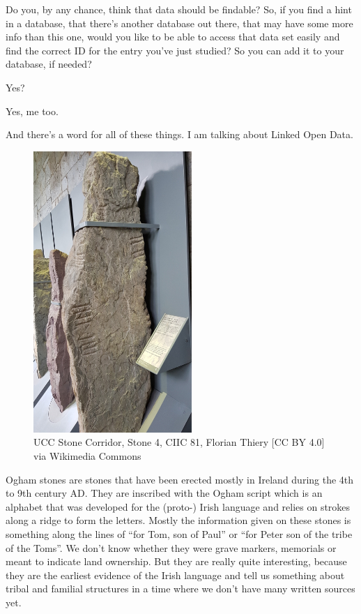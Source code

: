 \documentclass[twocolumn]{autart}
\begin{document}
Do you, by any chance, think that data should be findable? So, if you find a hint in a database, that there’s another database out there, that may have some more info than this one, would you like to be able to access that data set easily and find the correct ID for the entry you’ve just studied? So you can add it to your database, if needed?

Yes?

Yes, me too.

And there’s a word for all of these things. I am talking about Linked Open Data.

\begin{figure}[!htb]
\begin{center}
\includegraphics[width=6cm]{UCC_Stone_4.jpg}
\caption{UCC Stone Corridor, Stone 4, CIIC 81, Florian Thiery [CC BY 4.0] via Wikimedia Commons}
\label{rq1}
\end{center}
\end{figure}

Ogham stones are stones that have been erected mostly in Ireland during the 4th to 9th century AD. They are inscribed with the Ogham script which is an alphabet that was developed for the (proto-) Irish language and relies on strokes along a ridge to form the letters. Mostly the information given on these stones is something along the lines of “for Tom, son of Paul” or “for Peter son of the tribe of the Toms”. We don’t know whether they were grave markers, memorials or meant to indicate land ownership. But they are really quite interesting, because they are the earliest evidence of the Irish language and tell us something about tribal and familial structures in a time where we don’t have many written sources yet.
\end{document}
